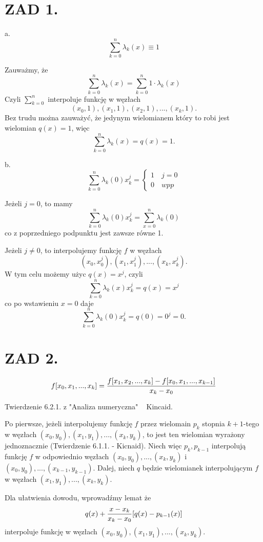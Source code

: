 \documentclass{article}[16pt]
\begin{document}
\section*{ZAD 1.}

a.
$$\sum\limits_{k=0}^n\lambda_k(x)\equiv 1$$

Zauważmy, że
$$\sum\limits_{k=0}^n\lambda_k(x)=\sum\limits_{k=0}^n1\cdot\lambda_k(x)$$
Czyli $\sum\limits_{k=0}^n$ interpoluje funkcję w węzłach
$$(x_0, 1),(x_1,1),(x_2,1),...,(x_k,1).$$
Bez trudu można zauważyć, że jedynym wielomianem który to robi jest wielomian $q(x)=1$, więc
$$\sum\limits_{k=0}^n\lambda_k(x)=q(x)=1.$$
\medskip

b.
$$\sum\limits_{k=0}^n\lambda_k(0)x_k^j=\begin{cases}1\quad j=0\\0\quad wpp\end{cases}$$

Jeżeli $j=0$, to mamy
$$\sum\limits_{k=0}^n\lambda_k(0)x_k^j=\sum\limits_{x=0}^n\lambda_k(0)$$
co z poprzedniego podpunktu jest zawsze równe 1.
\smallskip

Jeżeli $j\neq 0$, to interpolujemy funkcję $f$ w węzłach
$$(x_0,x_0^j),(x_1,x_1^j),...,(x_k,x_k^j).$$
W tym celu możemy użyc $q(x)=x^j$, czyli
$$\sum\limits_{k=0}^n\lambda_k(x)x_k^j=q(x)=x^j$$
co po wstawieniu $x=0$ daje
$$\sum\limits_{k=0}^n\lambda_k(0)x_k^j=q(0)=0^j=0.$$

\section*{ZAD 2.}

\begin{align*}
    f[x_0,x_1,...,x_k]={f[x_1,x_2,...,x_k]-f[x_0,x_1,...,x_{k-1}]\over x_k-x_0}
\end{align*}

Twierdzenie 6.2.1. z "Analiza numeryczna" ~ Kincaid.

Po pierwsze, jeżeli interpolujemy funkcję $f$ przez wielomain $p_k$ stopnia $k+1$-tego w węzłach $(x_0,y_0), (x_1,y_1),...,(x_k, y_k)$, to jest ten wielomian wyrażony jednoznacznie (Twierdzenie 6.1.1. - Kicnaid). Niech więc $p_k,p_{k-1}$ interpolują funkcję $f$ w odpowiednio węzłach $(x_0,y_0),...,(x_k,y_k)$ i $(x_0,y_0),...,(x_{k-1},y_{k-1})$. Dalej, niech $q$ będzie wielomianek interpolującym $f$ w węzłach $(x_1,y_1),...,(x_k,y_k)$.
\medskip

Dla ułatwienia dowodu, wprowadźmy lemat że 
$$q(x)+{x-x_k\over x_k-x_0}[q(x)-p_{k-1}(x)]$$
interpoluje funkcję w węzłach $(x_0,y_0),(x_1,y_1),...,(x_k,y_k)$.
\end{document}
